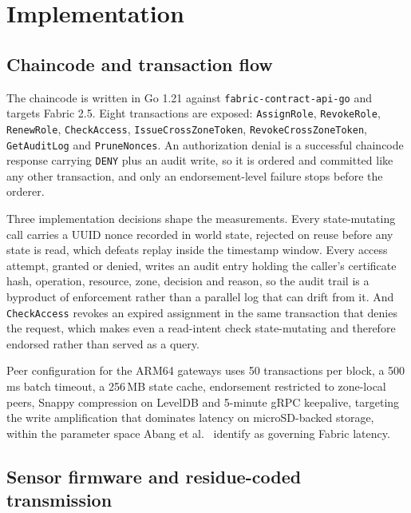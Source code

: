 \section{Implementation}
\label{sec:implementation}

\subsection{Chaincode and transaction flow}

The chaincode is written in Go 1.21 against \texttt{fabric-contract-api-go} and targets Fabric 2.5. Eight transactions are exposed: \texttt{AssignRole}, \texttt{RevokeRole}, \texttt{RenewRole}, \texttt{CheckAccess}, \texttt{IssueCrossZoneToken}, \texttt{RevokeCrossZoneToken}, \texttt{GetAuditLog} and \texttt{PruneNonces}. An authorization denial is a successful chaincode response carrying \texttt{DENY} plus an audit write, so it is ordered and committed like any other transaction, and only an endorsement-level failure stops before the orderer.

Three implementation decisions shape the measurements. Every state-mutating call carries a UUID nonce recorded in world state, rejected on reuse before any state is read, which defeats replay inside the timestamp window. Every access attempt, granted or denied, writes an audit entry holding the caller's certificate hash, operation, resource, zone, decision and reason, so the audit trail is a byproduct of enforcement rather than a parallel log that can drift from it. And \texttt{CheckAccess} revokes an expired assignment in the same transaction that denies the request, which makes even a read-intent check state-mutating and therefore endorsed rather than served as a query.

Peer configuration for the ARM64 gateways uses 50 transactions per block, a 500\,ms batch timeout, a 256\,MB state cache, endorsement restricted to zone-local peers, Snappy compression on LevelDB and 5-minute gRPC keepalive, targeting the write amplification that dominates latency on microSD-backed storage, within the parameter space Abang et al.\ \citep{abang2024latency} identify as governing Fabric latency.

\subsection{Sensor firmware and residue-coded transmission}
\label{sec:firmware}

